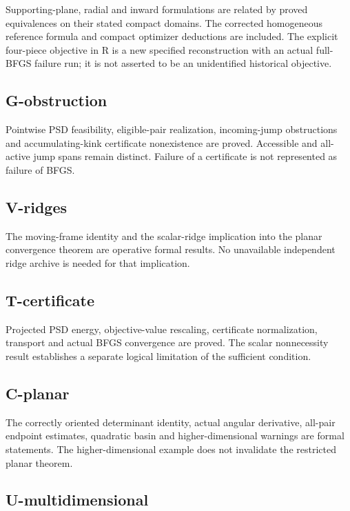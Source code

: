 Supporting-plane, radial and inward formulations are related by proved equivalences on their stated compact domains. The corrected homogeneous reference formula and compact optimizer deductions are included. The explicit four-piece objective in R is a new specified reconstruction with an actual full-BFGS failure run; it is not asserted to be an unidentified historical objective.

\subsection{G-obstruction}\label{g-obstruction}

Pointwise PSD feasibility, eligible-pair realization, incoming-jump obstructions and accumulating-kink certificate nonexistence are proved. Accessible and all-active jump spans remain distinct. Failure of a certificate is not represented as failure of BFGS.

\subsection{V-ridges}\label{v-ridges}

The moving-frame identity and the scalar-ridge implication into the planar convergence theorem are operative formal results. No unavailable independent ridge archive is needed for that implication.

\subsection{T-certificate}\label{t-certificate}

Projected PSD energy, objective-value rescaling, certificate normalization, transport and actual BFGS convergence are proved. The scalar nonnecessity result establishes a separate logical limitation of the sufficient condition.

\subsection{C-planar}\label{c-planar}

The correctly oriented determinant identity, actual angular derivative, all-pair endpoint estimates, quadratic basin and higher-dimensional warnings are formal statements. The higher-dimensional example does not invalidate the restricted planar theorem.

\subsection{U-multidimensional}\label{u-multidimensional}


